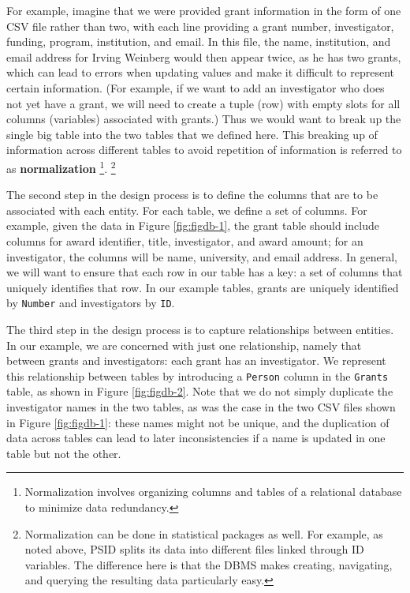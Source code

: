 \documentclass[]{krantz}
\begin{document}
For example, imagine that we were provided grant information in the form
of one CSV file rather than two, with each line providing a grant
number, investigator, funding, program, institution, and email. In this
file, the name, institution, and email address for Irving Weinberg would
then appear twice, as he has two grants, which can lead to errors when
updating values and make it difficult to represent certain information.
(For example, if we want to add an investigator who does not yet have a
grant, we will need to create a tuple (row) with empty slots for all
columns (variables) associated with grants.) Thus we would want to break
up the single big table into the two tables that we defined here. This
breaking up of information across different tables to avoid repetition
of information is referred to as \textbf{normalization} \footnote{Normalization
  involves organizing columns and tables of a relational database to
  minimize data redundancy.}. \footnote{Normalization can be done in
  statistical packages as well. For example, as noted above, PSID splits
  its data into different files linked through ID variables. The
  difference here is that the DBMS makes creating, navigating, and
  querying the resulting data particularly easy.}

The second step in the design process is to define the columns that are
to be associated with each entity. For each table, we define a set of
columns. For example, given the data in Figure \ref{fig:figdb-1}, the
grant table should include columns for award identifier, title,
investigator, and award amount; for an investigator, the columns will be
name, university, and email address. In general, we will want to ensure
that each row in our table has a key: a set of columns that uniquely
identifies that row. In our example tables, grants are uniquely
identified by \texttt{Number} and investigators by \texttt{ID}.

The third step in the design process is to capture relationships between
entities. In our example, we are concerned with just one relationship,
namely that between grants and investigators: each grant has an
investigator. We represent this relationship between tables by
introducing a \texttt{Person} column in the \texttt{Grants} table, as
shown in Figure \ref{fig:figdb-2}. Note that we do not simply duplicate
the investigator names in the two tables, as was the case in the two CSV
files shown in Figure \ref{fig:figdb-1}: these names might not be
unique, and the duplication of data across tables can lead to later
inconsistencies if a name is updated in one table but not the other.
\end{document}
